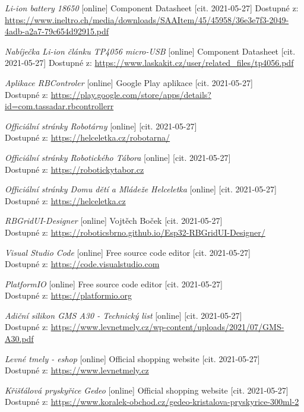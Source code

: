 \begin{thebibliography}{99}
\textit{Li-ion battery 18650} [online] Component Datasheet [cit. 2021-05-27] Dostupné z: \url{https://www.ineltro.ch/media/downloads/SAAItem/45/45958/36e3e7f3-2049-4adb-a2a7-79c654d92915.pdf}

\textit{Nabíječka Li-ion článku TP4056 micro-USB} [online] Component Datasheet [cit. 2021-05-27] Dostupné z: \url{https://www.laskakit.cz/user/related_files/tp4056.pdf}

\textit{Aplikace RBControler} [online] Google Play aplikace [cit. 2021-05-27] \\
Dostupné z: \url{https://play.google.com/store/apps/details?id=com.tassadar.rbcontrollerr}

\textit {Officiální stránky Robotárny} [online] [cit. 2021-05-27] \\
Dostupné z: \url{https://helceletka.cz/robotarna/}

\textit {Officiální stránky Robotického Tábora} [online] [cit. 2021-05-27] \\
Dostupné z: \url{https://robotickytabor.cz}

\textit {Officiální stránky Domu dětí a Mládeže Helceletka} [online] [cit. 2021-05-27] 
Dostupné z: \url{https://helceletka.cz}

\textit{RBGridUI-Designer} [online] Vojtěch Boček [cit. 2021-05-27] \\
Dostupné z: \url{https://roboticsbrno.github.io/Esp32-RBGridUI-Designer/} 

\textit{Visual Studio Code} [online] Free source code editor [cit. 2021-05-27] \\
Dostupné z: \url{https://code.visualstudio.com} 

\textit{PlatformIO} [online] Free source code editor [cit. 2021-05-27] \\
Dostupné z: \url{https://platformio.org} 

\textit{Adiční silikon GMS A30 - Technický list} [online] [cit. 2021-05-27] \\
Dostupné z: \url{https://www.levnetmely.cz/wp-content/uploads/2021/07/GMS-A30.pdf} 

\textit{Levné tmely - eshop} [online] Official shopping website [cit. 2021-05-27] \\
Dostupné z: \url{https://www.levnetmely.cz} 

\textit{Křišťálová pryskyřice Gedeo} [online] Official shopping website [cit. 2021-05-27] \\
Dostupné z: \url{https://www.koralek-obchod.cz/gedeo-kristalova-pryskyrice-300ml-2} 


\end{thebibliography}
